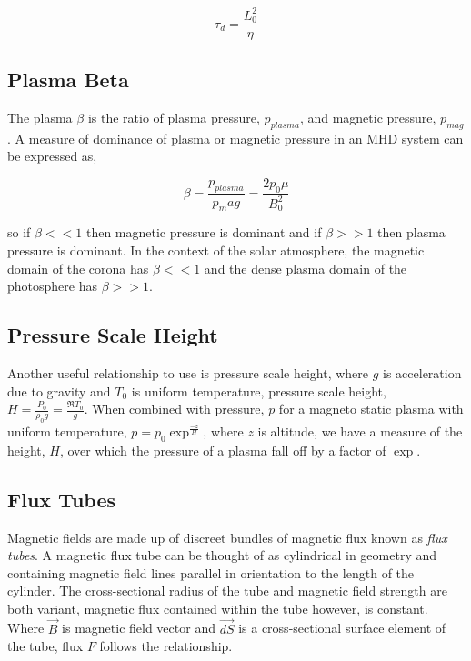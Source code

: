 \begin{equation}\label{difftime}
\tau_d = \frac{L_{0}^{2}}{\eta}
\end{equation}



%
\subsection{Plasma Beta}
The plasma $\beta$ is the ratio of plasma pressure, $p_{plasma}$, and magnetic pressure, $p_{mag}$. A measure of dominance of plasma or magnetic pressure in an MHD system can be expressed as, 

\begin{equation}\label{beta}
\beta=\frac{p_{plasma}}{p_mag} = \frac{2p_{0}\mu}{B_{0}^2}
\end{equation}

so if $\beta << 1$ then magnetic pressure is dominant and if $\beta >> 1$ then plasma pressure is dominant. In the context of the solar atmosphere, the magnetic domain of the corona has $\beta << 1$ and the dense plasma domain of the photosphere has $\beta >> 1$.

\subsection{Pressure Scale Height}
Another useful relationship to use is pressure scale height, where $g$ is acceleration due to gravity and $T_0$ is uniform temperature, pressure scale height, $H=\frac{P_0}{\rho_{0}g} = \frac{\Re T_{0}}{g}$. When combined with pressure, $p$ for a magneto static plasma with uniform temperature, $p=p_{0}\exp^{\frac{-z}{H}}$, where $z$ is altitude, we have a measure of the height, $H$, over which the pressure of a plasma fall off by a factor of $\exp$. 

\subsection{Flux Tubes}
Magnetic fields are made up of discreet bundles of magnetic flux known as \emph{flux tubes}. A magnetic flux tube can be thought of as cylindrical in geometry and containing magnetic field lines parallel in orientation to the length of the cylinder. The cross-sectional radius of the tube and magnetic field strength are both variant, magnetic flux contained within the tube however, is constant. Where $\vec{B}$ is magnetic field vector and $\vec{dS}$ is a cross-sectional surface element of the tube, flux $F$ follows the relationship.

